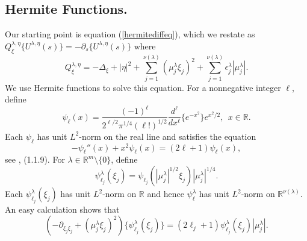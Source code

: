 \documentclass[12pt,reqno]{amsart}
\theoremstyle{definition}
\begin{document}
\subsection{Hermite Functions.} Our starting point is 
equation (\ref{hermitediffeq}), which we restate as
$Q_\xi^{\lambda,\eta} \{ U^{\lambda,\eta}(s) \} = -{\partial}_s \{ U^{\lambda,\eta}(s) \}$
where 
\[
Q_\xi^{\lambda,\eta} = - \Delta_\xi  + |\eta|^2 + \sum_{j=1}^{\nu(\lambda)}  ({\mu^\lambda_j} \xi_j)^2  +
\sum_{j=1}^{\nu(\lambda)} {\epsilon_j^\lambda} | {\mu^\lambda_j}|.
\]
We use Hermite functions to solve this equation. 
For a nonnegative integer $\ell$, define
\[
\psi_\ell(x) = 
\frac{(-1)^\ell} {2^{\ell/2} \pi^{1/4}(\ell!)^{1/2}}\frac{d^\ell}{dx^\ell}\{ e^{-x^2} \} e^{x^2/2} ,
\ \ x \in {\mathbb{R}}.
\]
Each $\psi_\ell$ has unit $L^2$-norm on the real line and satisfies
the equation
\[
- \psi_\ell ''(x) + x^2 \psi_\ell (x) = (2\ell+1) \psi_\ell(x),
\]
see \cite{Tha93}, (1.1.9).
For $\lambda\in{\mathbb{R}}^m\setminus\{0\}$, define
\[
\psi^\lambda_{\ell_j} (\xi_j) = \psi_{\ell_j} (|{\mu^\lambda_j}|^{1/2} \xi_j)
|{\mu^\lambda_j}|^{1/4}.
\]
Each $\psi^\lambda_{\ell_j} (\xi_j)$ has unit $L^2$-norm on ${\mathbb{R}}$
and hence $\psi^\lambda_\ell$ has unit $L^2$-norm on ${\mathbb{R}}^{\nu(\lambda)}$.
An easy calculation shows that 
\begin{equation}
\label{hermite1}
(-{\partial}_{\xi_j \xi_j} + ({\mu^\lambda_j}\xi_j)^2) \{ \psi_{\ell_j}^\lambda (\xi_j) \}
= (2\ell_j+1) \psi_{\ell_j}^\lambda (\xi_j) |{\mu^\lambda_j}|.
\end{equation}
\end{document}
